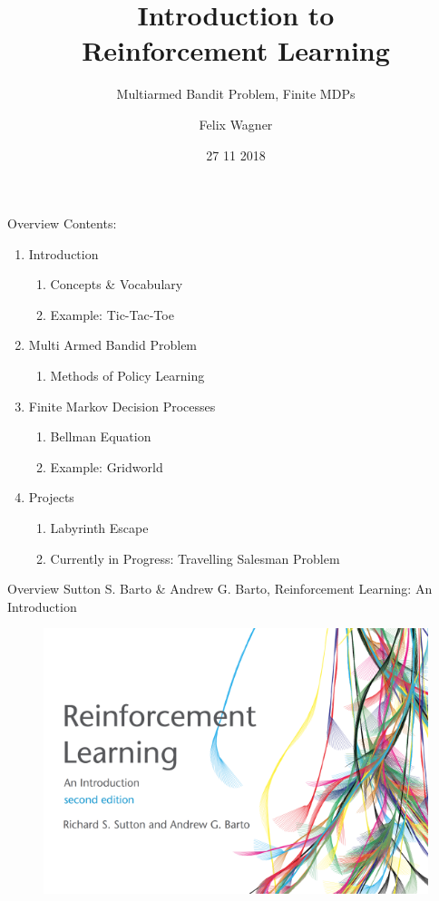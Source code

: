 \documentclass{beamer}
\title{Introduction to   \\ Reinforcement Learning}
\subtitle{Multiarmed Bandit Problem, Finite MDPs}
\author{Felix Wagner}
\institute{Seminar: Machine Learning \\ TU Vienna}
\date{27 11 2018}
\begin{document}

\begin{frame}
	\maketitle %
\end{frame}



\begin{frame}{Overview}
			Contents:
			\begin{enumerate}
				\item Introduction
				\begin{enumerate}
					\item Concepts \& Vocabulary
					\item Example: Tic-Tac-Toe
				\end{enumerate}
				\item Multi Armed Bandid Problem
				\begin{enumerate}
					\item Methods of Policy Learning
				\end{enumerate}
				\item Finite Markov Decision Processes
				\begin{enumerate}
					\item Bellman Equation
					\item Example: Gridworld
				\end{enumerate}
				\item Projects
				\begin{enumerate}
					\item Labyrinth Escape
					\item Currently in Progress: Travelling Salesman Problem
				\end{enumerate}
			\end{enumerate}
\end{frame}

\begin{frame}{Overview}
	Sutton S. Barto \& Andrew G. Barto, Reinforcement Learning: An Introduction

	\begin{figure}
	\centering
	\includegraphics[width=0.6\linewidth]{Images/suttonbarto.png}\\	
	\end{figure}
\end{frame}
\end{document}
